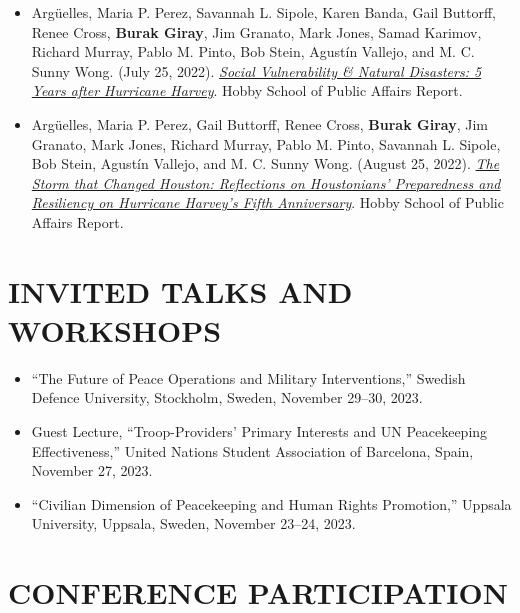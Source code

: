 \documentclass[11pt,a4paper,roman]{moderncv}
\begin{document}
	\begin{itemize}
		\item Arg{\"u}elles, Maria P. Perez, Savannah L. Sipole, Karen Banda, Gail Buttorff, Renee Cross, \textbf{Burak Giray}, Jim Granato, Mark Jones, Samad Karimov, Richard Murray, Pablo M. Pinto, Bob Stein, Agust{\'i}n Vallejo, and M. C. Sunny Wong. (July 25, 2022). \href{http://m2s-conf.uh.edu/hobby/harvey/harvey_4_vulnerability_report_final.pdf}{\textit{Social Vulnerability \& Natural Disasters: 5 Years after Hurricane Harvey}}. Hobby School of Public Affairs Report.
		\item Arg{\"u}elles, Maria P. Perez, Gail Buttorff, Renee Cross, \textbf{Burak Giray}, Jim Granato, Mark Jones, Richard Murray, Pablo M. Pinto, Savannah L. Sipole, Bob Stein, Agust{\'i}n Vallejo, and M. C. Sunny Wong. (August 25, 2022). \href{http://m2s-conf.uh.edu/hobby/harvey/harvey_5_report.pdf}{\textit{The Storm that Changed Houston: Reflections on Houstonians' Preparedness and Resiliency on Hurricane Harvey's Fifth Anniversary}}. Hobby School of Public Affairs Report.
	\end{itemize}
	
	\section{INVITED TALKS AND WORKSHOPS}
	
	\begin{itemize}
		\item ``The Future of Peace Operations and Military Interventions,'' Swedish Defence University, Stockholm, Sweden, November 29--30, 2023.
		\item Guest Lecture, ``Troop-Providers' Primary Interests and UN Peacekeeping Effectiveness,'' United Nations Student Association of Barcelona, Spain, November 27, 2023.
		\item ``Civilian Dimension of Peacekeeping and Human Rights Promotion,'' Uppsala University, Uppsala, Sweden, November 23--24, 2023.
	\end{itemize}
	
	\section{CONFERENCE PARTICIPATION}
	
\end{document}
